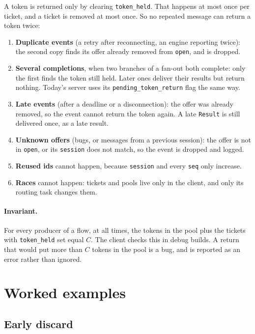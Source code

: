 \documentclass[11pt]{article}
\newcommand{\code}[1]{\texttt{#1}}
\begin{document}
A token is returned only by clearing \code{token\_held}. That happens at most
once per ticket, and a ticket is removed at most once. So no repeated message
can return a token twice:

\begin{enumerate}[nosep]
  \item \textbf{Duplicate events} (a retry after reconnecting, an engine
        reporting twice): the second copy finds its offer already removed
        from \code{open}, and is dropped.
  \item \textbf{Several completions}, when two branches of a fan-out both
        complete: only the first finds the token still held. Later ones
        deliver their results but return nothing. Today's server uses its
        \code{pending\_token\_return} flag the same way.
  \item \textbf{Late events} (after a deadline or a disconnection): the
        offer was already removed, so the event cannot return the token
        again. A late \code{Result} is still delivered once, as a late
        result.
  \item \textbf{Unknown offers} (bugs, or messages from a previous session):
        the offer is not in \code{open}, or its \code{session} does not
        match, so the event is dropped and logged.
  \item \textbf{Reused ids} cannot happen, because \code{session} and every
        \code{seq} only increase.
  \item \textbf{Races} cannot happen: tickets and pools live only in the
        client, and only its routing task changes them.
\end{enumerate}

\paragraph{Invariant.} For every producer of a flow, at all times, the tokens
in the pool plus the tickets with \code{token\_held} set equal $C$. The
client checks this in debug builds. A return that would put more than $C$
tokens in the pool is a bug, and is reported as an error rather than
ignored.

\section{Worked examples}
\label{sec:examples}

\subsection{Early discard}
\label{sec:early-discard}
\end{document}
